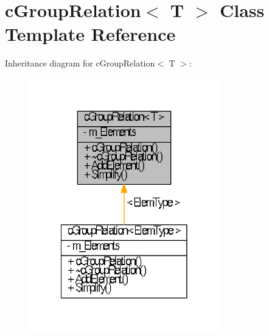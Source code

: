 \hypertarget{classcGroupRelation}{\section{c\-Group\-Relation$<$ \-T $>$ \-Class \-Template \-Reference}
\label{classcGroupRelation}
}


\-Inheritance diagram for c\-Group\-Relation$<$ \-T $>$\-:
\nopagebreak
\begin{figure}[H]
\begin{center}
\leavevmode
\includegraphics[width=234pt]{classcGroupRelation__inherit__graph}
\end{center}
\end{figure}


